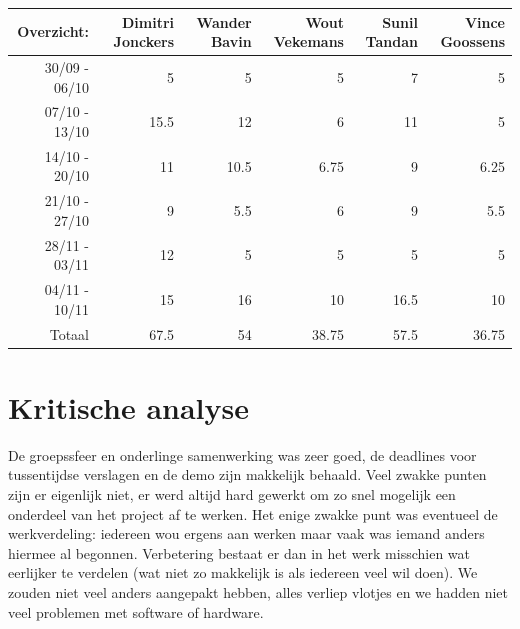 \documentclass[eind]{penoverslag}
\begin{document}
\begin{tabular}{r||r|r|r|r|r}
Overzicht: & Dimitri Jonckers & Wander Bavin & Wout Vekemans & Sunil Tandan & Vince Goossens \\
\hline \hline 
30/09 - 06/10 & 5 & 5 & 5 & 7 & 5 \\
07/10 - 13/10 & 15.5 & 12 & 6 & 11 & 5 \\
14/10 - 20/10 & 11 & 10.5 & 6.75 & 9 & 6.25 \\
21/10 - 27/10 & 9 & 5.5 & 6 & 9 & 5.5 \\
28/11 - 03/11 & 12 & 5 & 5 & 5 & 5 \\
04/11 - 10/11 & 15 & 16 & 10 & 16.5 & 10 \\
\hline \hline
Totaal & 67.5 & 54 & 38.75 & 57.5 & 36.75 \\
\end{tabular}

\section{Kritische analyse}
De groepssfeer en onderlinge samenwerking was zeer goed, de deadlines voor tussentijdse verslagen en de demo zijn makkelijk behaald. Veel zwakke punten zijn er eigenlijk niet, er werd altijd hard gewerkt om zo snel mogelijk een onderdeel van het project af te werken. Het enige zwakke punt was eventueel de werkverdeling: iedereen wou ergens aan werken maar vaak was iemand anders hiermee al begonnen. Verbetering bestaat er dan in het werk misschien wat eerlijker te verdelen (wat niet zo makkelijk is als iedereen veel wil doen). We zouden niet veel anders aangepakt hebben, alles verliep vlotjes en we hadden niet veel problemen met software of hardware.
\end{document}
